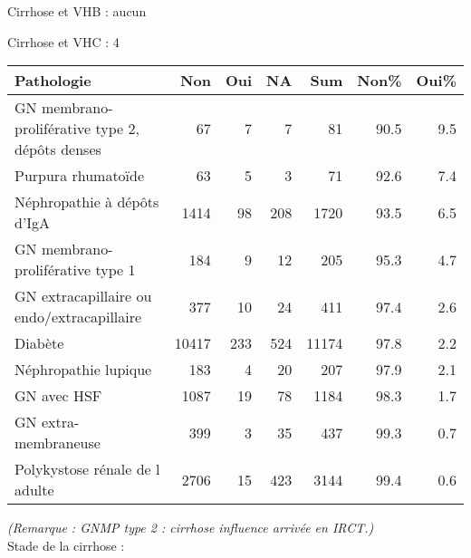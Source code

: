 \documentclass[11pt,a4paper]{article}\usepackage[]{graphicx}\usepackage[]{color}
\begin{document}
Cirrhose et VHB : aucun

Cirrhose et VHC : 4

\begin{table}[H]
\centering
\begin{tabular}{lrrrrrr}
  \hline
Pathologie & Non & Oui & NA & Sum & Non\% & Oui\% \\ 
  \hline
GN membrano-proliférative type 2, dépôts denses & 67 &  7 &  7 & 81 & 90.5 & 9.5 \\ 
  Purpura rhumatoïde & 63 &  5 &  3 & 71 & 92.6 & 7.4 \\ 
  Néphropathie à dépôts d'IgA & 1414 & 98 & 208 & 1720 & 93.5 & 6.5 \\ 
  GN membrano-proliférative type 1 & 184 &  9 & 12 & 205 & 95.3 & 4.7 \\ 
  GN extracapillaire ou endo/extracapillaire & 377 & 10 & 24 & 411 & 97.4 & 2.6 \\ 
  Diabète & 10417 & 233 & 524 & 11174 & 97.8 & 2.2 \\ 
  Néphropathie lupique & 183 &  4 & 20 & 207 & 97.9 & 2.1 \\ 
  GN avec HSF & 1087 & 19 & 78 & 1184 & 98.3 & 1.7 \\ 
  GN extra-membraneuse & 399 &  3 & 35 & 437 & 99.3 & 0.7 \\ 
  Polykystose rénale de l adulte & 2706 & 15 & 423 & 3144 & 99.4 & 0.6 \\ 
   \hline
\end{tabular}
\end{table}


\textit{(Remarque : GNMP type 2 : cirrhose influence arrivée en IRCT.)}
~\\

Stade de la cirrhose :
\end{document}
